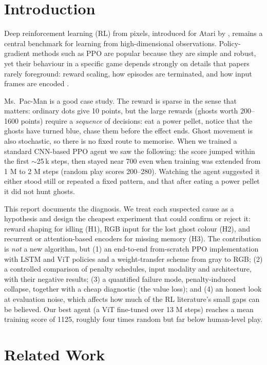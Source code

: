 \documentclass[11pt]{article}
\begin{document}
\section{Introduction}
\label{sec:intro}
Deep reinforcement learning (RL) from pixels, introduced for Atari by \citet{mnih2015dqn}, remains a central benchmark for learning from high-dimensional observations. Policy-gradient methods such as PPO \citep{schulman2017ppo} are popular because they are simple and robust, yet their behaviour in a specific game depends strongly on details that papers rarely foreground: reward scaling, how episodes are terminated, and how input frames are encoded \citep{engstrom2020implementation,huang2022ppo37,henderson2018matters}.

Ms.\ Pac-Man is a good case study. The reward is sparse in the sense that matters: ordinary dots give 10 points, but the large rewards (ghosts worth 200--1600 points) require a \emph{sequence} of decisions: eat a power pellet, notice that the ghosts have turned blue, chase them before the effect ends. Ghost movement is also stochastic, so there is no fixed route to memorise. When we trained a standard CNN-based PPO agent we saw the following: the score jumped within the first $\sim$25\,k steps, then stayed near 700 even when training was extended from 1 M to 2 M steps (random play scores 200--280). Watching the agent suggested it either stood still or repeated a fixed pattern, and that after eating a power pellet it did not hunt ghosts.

This report documents the diagnosis. We treat each suspected cause as a hypothesis and design the cheapest experiment that could confirm or reject it: reward shaping for idling (H1), RGB input for the lost ghost colour (H2), and recurrent or attention-based encoders for missing memory (H3). The contribution is \emph{not} a new algorithm, but (1) an end-to-end from-scratch PPO implementation with LSTM and ViT policies and a weight-transfer scheme from gray to RGB; (2) a controlled comparison of penalty schedules, input modality and architecture, with their negative results; (3) a quantified failure mode, penalty-induced collapse, together with a cheap diagnostic (the value loss); and (4) an honest look at evaluation noise, which affects how much of the RL literature's small gaps can be believed. Our best agent (a ViT fine-tuned over 13 M steps) reaches a mean training score of 1125, roughly four times random but far below human-level play.

\section{Related Work}
\label{sec:related}
\end{document}
